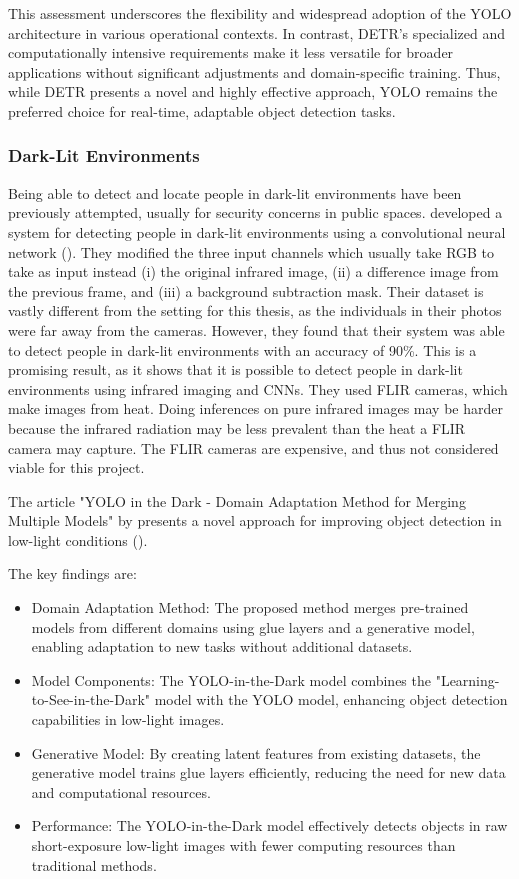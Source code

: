 This assessment underscores the flexibility and widespread adoption of the YOLO architecture in various operational contexts. In contrast, DETR's specialized and computationally intensive requirements make it less versatile for broader applications without significant adjustments and domain-specific training. Thus, while DETR presents a novel and highly effective approach, YOLO remains the preferred choice for real-time, adaptable object detection tasks.


\subsubsection{Dark-Lit Environments}
Being able to detect and locate people in dark-lit environments have been previously attempted, usually for security concerns in public spaces. \citeauthor{pa2020PersonDetectionNightTimeFLIR} developed a system for detecting people in dark-lit environments using a convolutional neural network (\citeyear{pa2020PersonDetectionNightTimeFLIR}). They modified the three input channels which usually take RGB to take as input instead (i) the original infrared image, (ii) a difference image from the previous frame, and (iii) a background subtraction mask. Their dataset is vastly different from the setting for this thesis, as the individuals in their photos were far away from the cameras. However, they found that their system was able to detect people in dark-lit environments with an accuracy of 90\%. This is a promising result, as it shows that it is possible to detect people in dark-lit environments using infrared imaging and CNNs. They used FLIR cameras, which make images from heat. Doing inferences on pure infrared images may be harder because the infrared radiation may be less prevalent than the heat a FLIR camera may capture. The FLIR cameras are expensive, and thus not considered viable for this project.

The article "YOLO in the Dark - Domain Adaptation Method for Merging Multiple Models" by \citeauthor{Sasagawa2020YOLO} presents a novel approach for improving object detection in low-light conditions (\citeyear{Sasagawa2020YOLO}). 

The key findings are: 
\begin{itemize}
    \item Domain Adaptation Method: The proposed method merges pre-trained models from different domains using glue layers and a generative model, enabling adaptation to new tasks without additional datasets. 
    \item Model Components: The YOLO-in-the-Dark model combines the "Learning-to-See-in-the-Dark" model with the YOLO model, enhancing object detection capabilities in low-light images. 
    \item Generative Model: By creating latent features from existing datasets, the generative model trains glue layers efficiently, reducing the need for new data and computational resources. 
    \item Performance: The YOLO-in-the-Dark model effectively detects objects in raw short-exposure low-light images with fewer computing resources than traditional methods.
\end{itemize}

